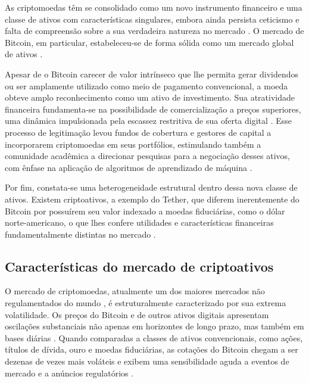 As criptomoedas têm se consolidado como um novo instrumento financeiro e uma classe de ativos com características singulares, embora ainda persista ceticismo e falta de compreensão sobre a sua verdadeira natureza no mercado \cite{charfeddine2020investigating,corbet2020contagion}. O mercado de Bitcoin, em particular, estabeleceu-se de forma sólida como um mercado global de ativos \cite{park2023intelligent}.

Apesar de o Bitcoin carecer de valor intrínseco que lhe permita gerar dividendos ou ser amplamente utilizado como meio de pagamento convencional, a moeda obteve amplo reconhecimento como um ativo de investimento. Sua atratividade financeira fundamenta-se na possibilidade de comercialização a preços superiores, uma dinâmica impulsionada pela escassez restritiva de sua oferta digital \cite{park2023intelligent}. Esse processo de legitimação levou fundos de cobertura e gestores de capital a incorporarem criptomoedas em seus portfólios, estimulando também a comunidade acadêmica a direcionar pesquisas para a negociação desses ativos, com ênfase na aplicação de algoritmos de aprendizado de máquina \cite{sebastiao2021forecasting}.

Por fim, constata-se uma heterogeneidade estrutural dentro dessa nova classe de ativos. Existem criptoativos, a exemplo do Tether, que diferem inerentemente do Bitcoin por possuírem seu valor indexado a moedas fiduciárias, como o dólar norte-americano, o que lhes confere utilidades e características financeiras fundamentalmente distintas no mercado \cite{goodell2021diversifying}.

\subsection{Características do mercado de criptoativos}
\label{subsec_caracteristicas_do_mercado_de_criptoativos}

O mercado de criptomoedas, atualmente um dos maiores mercados não regulamentados do mundo \cite{sebastiao2021forecasting}, é estruturalmente caracterizado por sua extrema volatilidade. Os preços do Bitcoin e de outros ativos digitais apresentam oscilações substanciais não apenas em horizontes de longo prazo, mas também em bases diárias \cite{baur2021crypto}. Quando comparadas a classes de ativos convencionais, como ações, títulos de dívida, ouro e moedas fiduciárias, as cotações do Bitcoin chegam a ser dezenas de vezes mais voláteis e exibem uma sensibilidade aguda a eventos de mercado e a anúncios regulatórios \cite{fakhfekh2020volatility,park2023intelligent}.

